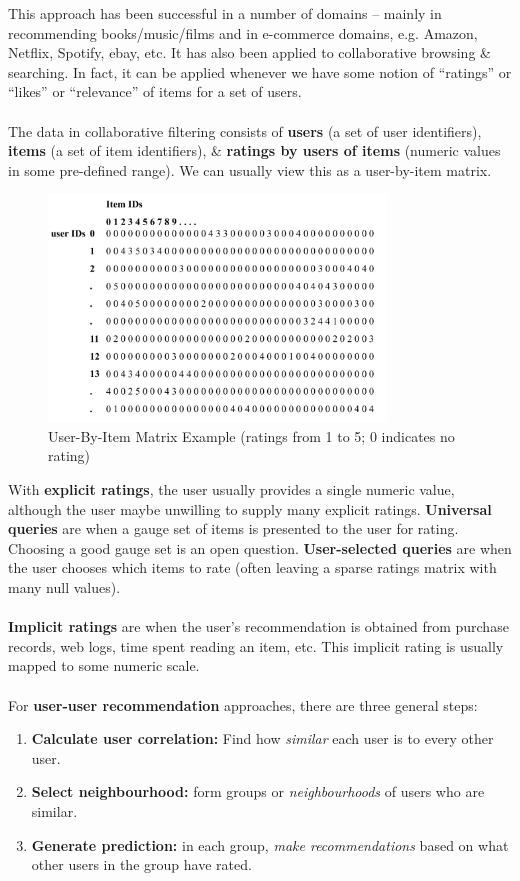 \documentclass[a4paper,11pt]{article}
\begin{document}
This approach has been successful in a number of domains -- mainly in recommending books/music/films and in e-commerce domains, e.g. Amazon, Netflix, Spotify, ebay, etc.
It has also been applied to collaborative browsing \& searching.
In fact, it can be applied whenever we have some notion of ``ratings'' or ``likes'' or ``relevance'' of items for a set of users.
\\\\
The data in collaborative filtering consists of \textbf{users} (a set of user identifiers), \textbf{items} (a set of item identifiers), \& \textbf{ratings by users of items} (numeric values in some pre-defined range).
We can usually view this as a user-by-item matrix.

\begin{figure}[H]
    \centering
    \includegraphics[width=0.8\textwidth]{./images/userbyitemmatrix.png}
    \caption{User-By-Item Matrix Example (ratings from 1 to 5; 0 indicates no rating)}
\end{figure}

With \textbf{explicit ratings}, the user usually provides a single numeric value, although the user maybe unwilling to supply many explicit ratings.
\textbf{Universal queries} are when a gauge set of items is presented to the user for rating.
Choosing a good gauge set is an open question.
\textbf{User-selected queries} are when the user chooses which items to rate (often leaving a sparse ratings matrix with many null values).
\\\\
\textbf{Implicit ratings} are when the user's recommendation is obtained from purchase records, web logs, time spent reading an item, etc.
This implicit rating is usually mapped to some numeric scale.
\\\\
For \textbf{user-user recommendation} approaches, there are three general steps:
\begin{enumerate}
    \item   \textbf{Calculate user correlation:} Find how \textit{similar} each user is to every other user.
    \item   \textbf{Select neighbourhood:} form groups or \textit{neighbourhoods} of users who are similar. 
    \item   \textbf{Generate prediction:} in each group, \textit{make recommendations} based on what other users in the group have rated.
\end{enumerate}
\end{document}
